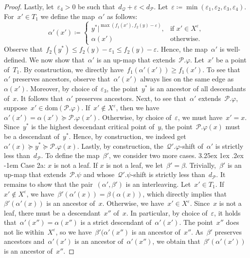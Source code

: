\documentclass[11pt]{article}
\makeatletter
\newcommand{\dom}{\mathrm{dom}}
\newcommand{\an}[2]{#1|^{#2}}
\newcommand{\resdist}[1]{d_{#1}}
\newcommand{\eps}{\varepsilon}
\renewcommand{\phi}{\varphi}
\renewcommand{\P}{\mathcal{P}}
\newcommand{\Q}{\mathcal{Q}}
\newcommand{\proofsubparagraph}{\@startsection{subparagraph}{5}{\z@}%
                                       {3.25ex \@plus1ex \@minus .2ex}%
                                       {-1em}%
                                      {\color{lipicsGray}\sffamily\normalsize\bfseries}}
\makeatother
\begin{document}
\begin{proof}
    Lastly, let~$\eps_4 > 0$ be such that~$\resdist{\Q} + \eps < \resdist{\P}$.
    Let~$\eps \coloneqq \min(\eps_1, \eps_2, \eps_3, \eps_4)$.
    For~$x' \in T_1$ we define the map~$\alpha'$ as follows:
    \[
        \alpha'(x') \coloneqq \begin{cases}
            \an{y^*}{\max(f_1(x'), f_2(y)-\eps)}, & \text{if } x' \in X^\eps, \\
            \alpha(x') & \text{otherwise.}
        \end{cases}
    \]
    Observe that~$f_2(y^*) \le f_2(y) - \eps_1 \le f_2(y) - \eps$.
    Hence, the map~$\alpha'$ is well-defined.
    We now show that~$\alpha'$ is an up-map that extends~$\P.\phi$.
%
    Let~$x'$ be a point of~$T_1$.
    By construction, we directly have~$f_1(\alpha'(x')) \ge f_1(x')$.
    To see that~$\alpha'$ preserves ancestors, observe that~$\alpha'(x')$ always lies on the same edge as~$\alpha(x')$.
    Moreover, by choice of~$\eps_3$, the point~$y^*$ is an ancestor of all descendants of~$x$.
    It follows that~$\alpha'$ preserves ancestors.
    Next, to see that~$\alpha'$ extends~$\P.\phi$, suppose~$x' \in \dom(\P.\phi)$.
    If~$x' \notin X^\eps$, then we have~$\alpha'(x') = \alpha(x') \succeq \P.\phi(x')$.
    Otherwise, by choice of~$\eps$, we must have~$x' = x$.
    Since~$y^*$ is the highest descendant critical point of~$y$, the point~$\P.\phi(x)$ must be a descendant of~$y^*$.
    Hence, by construction, we indeed get~$\alpha'(x) \succeq y^* \succeq \P.\phi(x)$.
    Lastly, by construction, the~$\Q'.\phi$-shift of~$\alpha'$ is strictly less than~$\resdist{\P}$. 
%
    To define the map~$\beta'$, we consider two more cases.
%
    \proofsubparagraph{Case 2a: $x$ is not a leaf.}
    If $x$ is not a leaf, we let~$\beta' = \beta$.
    Trivially,~$\beta'$ is an up-map that extends~$\P.\psi$ and whose~$\Q'.\psi$-shift is strictly less than~$\resdist{\P}$.
    It remains to show that the pair~$(\alpha', \beta')$ is an interleaving.
%
    Let~$x' \in T_1$.
    If~$x' \notin X^\eps$, we have~$\beta'(\alpha'(x)) = \beta(\alpha(x))$, which directly implies that~$\beta'(\alpha'(x))$ is an ancestor of~$x$.
    Otherwise, we have~$x' \in X^\eps$.
    Since~$x$ is not a leaf, there must be a descendant~$x''$ of~$x$.
    In particular, by choice of~$\eps$, it holds that~$\alpha'(x'') = \alpha(x'')$ is a strict descendant of~$\alpha'(x')$.
    The point~$x''$ does not lie within~$X^\eps$, so we have~$\beta'(\alpha'(x'')$ is an ancestor of~$x''$.
    As~$\beta'$ preserves ancestors and~$\alpha'(x')$ is an ancestor of~$\alpha'(x'')$, we obtain that~$\beta'(\alpha'(x'))$ is an ancestor of~$x''$.

\end{proof}
\end{document}
